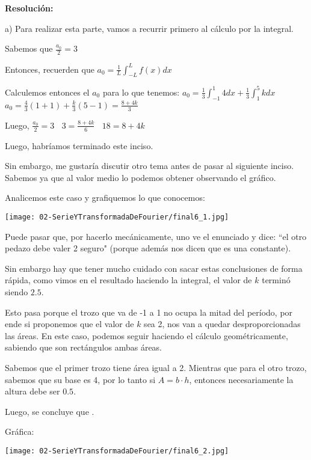 \documentclass[11pt]{article}
\begin{document}
	\textbf{Resolución:}
	
	a) Para realizar esta parte, vamos a recurrir primero al cálculo por la integral.
	
	Sabemos que $\displaystyle \frac{a_{0}}{2}=3$
	
	Entonces, recuerden que $a_{0}=\displaystyle \frac{1}{L} \int_{-L}^{L}f(x)dx$
	
	Calculemos entonces el $a_{0}$ para lo que tenemos: $\displaystyle a_{0}= \frac{1}{3} \int_{-1}^{1} 4dx + \frac{1}{3} \int_{1}^{5}kdx$\\
	$\displaystyle a_{0}=\frac{4}{3} \left(1+1\right) + \frac{k}{3} \left(5-1\right)=\frac{8+4k}{3}$
	
	Luego, $\displaystyle \frac{a_{0}}{2}=3\;$ \textrightarrow $\;\displaystyle 3=\frac{8+4k}{6}\;$ \textrightarrow $\;18=8+4k \;$ \textrightarrow {}
	
	Luego, habríamos terminado este inciso.
	
	Sin embargo, me gustaría discutir otro tema antes de pasar al siguiente inciso. Sabemos ya que al valor medio lo podemos obtener observando el gráfico.
	
	Analicemos este caso y grafiquemos lo que conocemos:
	\begin{center}
		\texttt{[image: 02-SerieYTransformadaDeFourier/final6\_1.jpg]}
	\end{center}

	Puede pasar que, por hacerlo mecánicamente, uno ve el enunciado y dice: ``el otro pedazo debe valer 2 seguro" (porque además nos dicen que es una constante).
	
	Sin embargo hay que tener mucho cuidado con sacar estas conclusiones de forma rápida, como vimos en el resultado haciendo la integral, el valor de $k$ terminó siendo $2.5$.
	
	Esto pasa porque el trozo que va de -1 a 1 no ocupa la mitad del período, por ende si proponemos que el valor de $k$ sea 2, nos van a quedar desproporcionadas las áreas. En este caso, podemos seguir haciendo el cálculo geométricamente, sabiendo que son rectángulos ambas áreas.
	
	Sabemos que el primer trozo tiene área igual a 2. Mientras que para el otro trozo, sabemos que su base es 4, por lo tanto si $A=b\cdot h$, entonces necesariamente la altura debe ser $0.5$.
	
	Luego, se concluye que .
	
	Gráfica:
	\begin{center}
		\texttt{[image: 02-SerieYTransformadaDeFourier/final6\_2.jpg]}
	\end{center}
\end{document}
